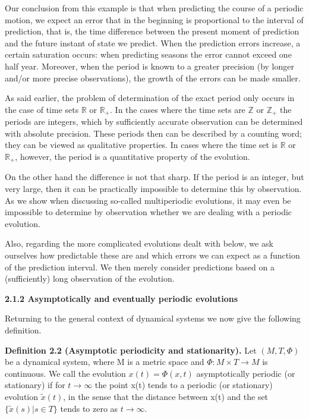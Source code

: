 \documentclass{article}
\begin{document}
\hfill

Our conclusion from this example is that when predicting the course of a periodic
motion, we expect an error that in the beginning is proportional to the interval of
prediction, that is, the time difference between the present moment of prediction
and the future instant of state we predict. When the prediction errors increase, a
certain saturation occurs: when predicting seasons the error cannot exceed one half
year. Moreover, when the period is known to a greater precision (by longer and/or
more precise observations), the growth of the errors can be made smaller.

\hfill

As said earlier, the problem of determination of the exact period only occurs in
the case of time sets $\mathbb{R}$ or $\mathbb{R}_{+}$. In the cases where the time sets are $\mathbb{Z}$ or $\mathbb{Z}_{+}$ the
periods are integers, which by sufficiently accurate observation can be determined
with absolute precision. These periods then can be described by a counting word;
they can be viewed as qualitative properties. In cases where the time set is $\mathbb{R}$ or $\mathbb{R}_{+}$,
however, the period is a quantitative property of the evolution.

\hfill

On the other hand the difference is not that sharp. If the period is an integer,
but very large, then it can be practically impossible to determine this by observation.
As we show when discussing so-called multiperiodic evolutions, it may even
be impossible to determine by observation whether we are dealing with a periodic
evolution.

\hfill


Also, regarding the more complicated evolutions dealt with below, we ask ourselves
how predictable these are and which errors we can expect as a function of the
prediction interval. We then merely consider predictions based on a (sufficiently)
long observation of the evolution.

\hfill

\textbf{2.1.2 Asymptotically and eventually periodic evolutions}

\hfill

Returning to the general context of dynamical systems we now give the following
definition.

\hfill

\textbf{Definition 2.2 (Asymptotic periodicity and stationarity).} Let $(M, T, \Phi)$ be a
dynamical system, where M is a metric space and $\Phi: M \times T \to M$ is continuous.
We call the evolution $x(t) = \Phi(x,t)$ asymptotically periodic (or stationary) if for $t \to \infty$ the point x(t) tends to a periodic (or stationary) evolution $\tilde{x}(t)$, in the sense
that the distance between x(t) and the set $\{ \tilde{x}(s) | s \in T \}$ tends to zero as $t \to \infty$.
\end{document}
